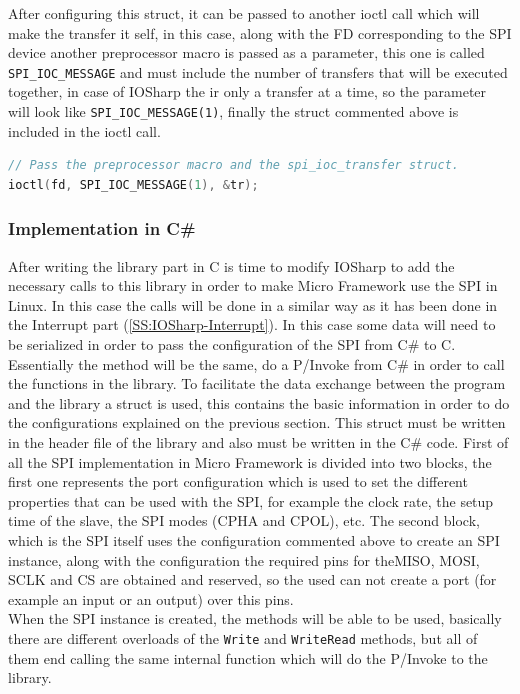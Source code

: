 After configuring this struct, it can be passed to another ioctl call which will make the transfer it self, in this case, along with the \gls{FD} corresponding to the SPI device another preprocessor macro is passed as a parameter, this one is called \verb!SPI_IOC_MESSAGE! and must include the number of transfers that will be executed together, in case of IOSharp the ir only a transfer at a time, so the parameter will look like \verb!SPI_IOC_MESSAGE(1)!, finally the struct commented above is included in the ioctl call.

\begin{lstlisting}[language=C, caption={IOSharp.c - SPI transfer}]
// Pass the preprocessor macro and the spi_ioc_transfer struct.
ioctl(fd, SPI_IOC_MESSAGE(1), &tr);
\end{lstlisting}

\subsubsection{Implementation in C\#}\label{SSS:IOSharp-SPI-Implementation-CSharp}
After writing the library part in C is time to modify IOSharp to add the necessary calls to this library in order to make Micro Framework use the SPI in Linux. In this case the calls will be done in a similar way as it has been done in the Interrupt part (\ref{SS:IOSharp-Interrupt}). In this case some data will need to be serialized in order to pass the configuration of the SPI from C\# to C.
\\
Essentially the method will be the same, do a P/Invoke from C\# in order to call the functions in the library. To facilitate the data exchange between the program and the library a struct is used, this contains the basic information in order to do the configurations explained on the previous section. This struct must be written in the header file of the library and also must be written in the C\# code. First of all the SPI implementation in Micro Framework is divided into two blocks, the first one represents the port configuration which is used to set the different properties that can be used with the SPI, for example the clock rate, the setup time of the slave, the SPI modes (CPHA and CPOL), etc. The second block, which is the SPI itself uses the configuration commented above to create an SPI instance, along with the configuration the required pins for the\gls{MISO}, \gls{MOSI}, \gls{SCLK} and \gls{CS} are obtained and reserved, so the used can not create a port (for example an input or an output) over this pins.
\\
When the SPI instance is created, the methods will be able to be used, basically there are different overloads of the \verb!Write! and \verb!WriteRead! methods, but all of them end calling the same internal function which will do the P/Invoke to the library.

